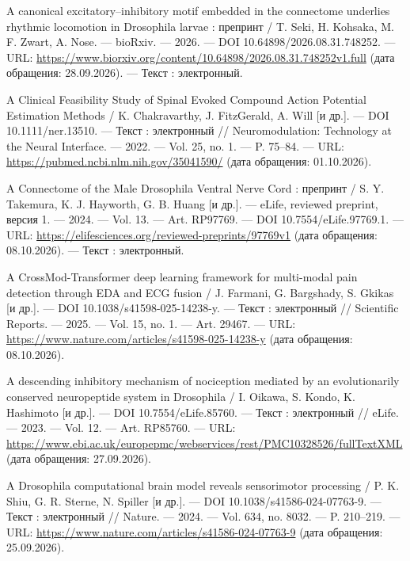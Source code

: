 \begingroup
\fontsize{12}{20.7}\selectfont
\raggedright
\begin{list}{}{\setlength{\leftmargin}{10mm}\setlength{\labelwidth}{8mm}\setlength{\labelsep}{2mm}\setlength{\itemsep}{0pt}\setlength{\parsep}{0pt}\setlength{\topsep}{0pt}}
\item[1.] A canonical excitatory–inhibitory motif embedded in the connectome underlies rhythmic locomotion in Drosophila larvae : препринт / T. Seki, H. Kohsaka, M. F. Zwart, A. Nose. — bioRxiv. — 2026. — DOI 10.64898/2026.08.31.748252. — URL: \url{https://www.biorxiv.org/content/10.64898/2026.08.31.748252v1.full} (дата обращения: 28.09.2026). — Текст : электронный.
\item[2.] A Clinical Feasibility Study of Spinal Evoked Compound Action Potential Estimation Methods / K. Chakravarthy, J. FitzGerald, A. Will [и др.]. — DOI 10.1111/ner.13510. — Текст : электронный // Neuromodulation: Technology at the Neural Interface. — 2022. — Vol. 25, no. 1. — P. 75–84. — URL: \url{https://pubmed.ncbi.nlm.nih.gov/35041590/} (дата обращения: 01.10.2026).
\item[3.] A Connectome of the Male Drosophila Ventral Nerve Cord : препринт / S. Y. Takemura, K. J. Hayworth, G. B. Huang [и др.]. — eLife, reviewed preprint, версия 1. — 2024. — Vol. 13. — Art. RP97769. — DOI 10.7554/eLife.97769.1. — URL: \url{https://elifesciences.org/reviewed-preprints/97769v1} (дата обращения: 08.10.2026). — Текст : электронный.
\item[4.] A CrossMod-Transformer deep learning framework for multi-modal pain detection through EDA and ECG fusion / J. Farmani, G. Bargshady, S. Gkikas [и др.]. — DOI 10.1038/s41598-025-14238-y. — Текст : электронный // Scientific Reports. — 2025. — Vol. 15, no. 1. — Art. 29467. — URL: \url{https://www.nature.com/articles/s41598-025-14238-y} (дата обращения: 08.10.2026).
\item[5.] A descending inhibitory mechanism of nociception mediated by an evolutionarily conserved neuropeptide system in Drosophila / I. Oikawa, S. Kondo, K. Hashimoto [и др.]. — DOI 10.7554/eLife.85760. — Текст : электронный // eLife. — 2023. — Vol. 12. — Art. RP85760. — URL: \url{https://www.ebi.ac.uk/europepmc/webservices/rest/PMC10328526/fullTextXML} (дата обращения: 27.09.2026).
\item[6.] A Drosophila computational brain model reveals sensorimotor processing / P. K. Shiu, G. R. Sterne, N. Spiller [и др.]. — DOI 10.1038/s41586-024-07763-9. — Текст : электронный // Nature. — 2024. — Vol. 634, no. 8032. — P. 210–219. — URL: \url{https://www.nature.com/articles/s41586-024-07763-9} (дата обращения: 25.09.2026).

\end{list}
